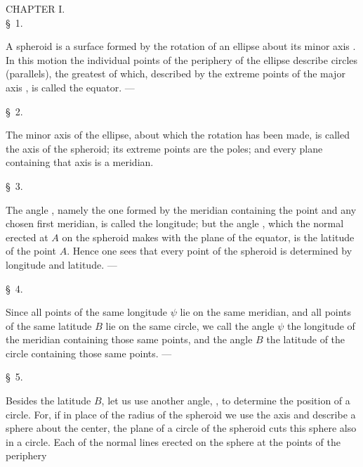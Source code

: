 \begin{center}
{\large CHAPTER I.}\\[0.8em]
\S\ 1.
\end{center}

A spheroid is a surface formed by the rotation of an ellipse about its minor axis . In this motion the individual points of the periphery of the ellipse describe circles (parallels), the greatest of which, described by the extreme points of the major axis , is called the equator. ---

\begin{center}\S\ 2.\end{center}
The minor axis of the ellipse, about which the rotation has been made, is called the axis of the spheroid; its extreme points are the poles; and every plane containing that axis is a meridian.

\begin{center}\S\ 3.\end{center}
The angle \gq{$\psi$}, namely the one formed by the meridian containing the point  and any chosen first meridian, is called the longitude; but the angle , which the normal erected at $A$ on the spheroid makes with the plane of the equator, is the latitude of the point $A$. Hence one sees that every point of the spheroid is determined by longitude and latitude. ---

\begin{center}\S\ 4.\end{center}
Since all points of the same longitude $\psi$ lie on the same meridian, and all points of the same latitude $B$ lie on the same circle, we call the angle $\psi$ the longitude of the meridian containing those same points, and the angle $B$ the latitude of the circle containing those same points. ---

\begin{center}\S\ 5.\end{center}
Besides the latitude $B$, let us use another angle, , to determine the position of a circle. For, if in place of the radius of the spheroid we use the axis  and describe a sphere about the center, the plane of a circle of the spheroid cuts this sphere also in a circle. Each of the normal lines erected on the sphere at the points of the periphery
